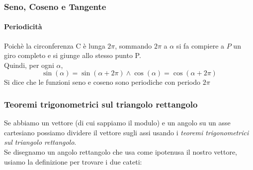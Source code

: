 \documentclass[12pt, a4paper, openany]{book}
\begin{document}
\subsubsection{Seno, Coseno e Tangente}
\paragraph*{Periodicità}
Poichè la circonferenza C è lunga $2\pi$, sommando $2\pi$ a $\alpha$ si fa compiere a $P$
un giro completo e si giunge allo stesso punto P.
\\Quindi, per ogni $\alpha$,
\[\sin(\alpha) = \sin(\alpha + 2\pi) \wedge \cos(\alpha) = \cos(\alpha+2\pi)\]
Si dice che le funzioni seno e coseno sono periodiche con periodo $2\pi$

\subsubsection{Teoremi trigonometrici sul triangolo rettangolo}
Se abbiamo un vettore (di cui sappiamo il modulo) e un angolo su un asse cartesiano possiamo dividere il vettore sugli assi usando i
\emph{teoremi trigonometrici sul triangolo rettangolo}.
\\Se disegnamo un angolo rettangolo che usa come ipotenusa il nostro vettore, usiamo la definizione per trovare i due cateti:
\end{document}
